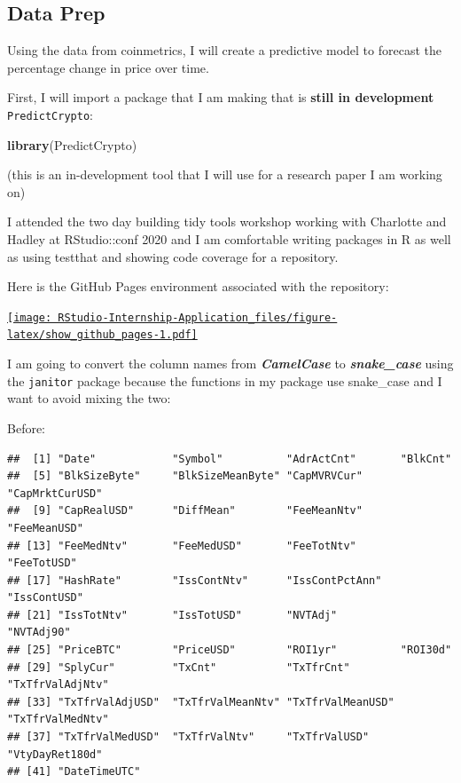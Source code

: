 \documentclass[
]{book}
\newenvironment{Shaded}{\begin{snugshade}}{\end{snugshade}}
\newcommand{\KeywordTok}[1]{\textcolor[rgb]{0.13,0.29,0.53}{\textbf{#1}}}
\newcommand{\NormalTok}[1]{#1}
\begin{document}
\hypertarget{data-prep}{%
\subsection{Data Prep}\label{data-prep}}

Using the data from coinmetrics, I will create a predictive model to forecast the percentage change in price over time.

First, I will import a package that I am making that is \textbf{still in development} \texttt{PredictCrypto}:

\begin{Shaded}
\begin{Highlighting}[]
\KeywordTok{library}\NormalTok{(PredictCrypto)}
\end{Highlighting}
\end{Shaded}

(this is an in-development tool that I will use for a research paper I am working on)

I attended the two day building tidy tools workshop working with Charlotte and Hadley at RStudio::conf 2020 and I am comfortable writing packages in R as well as using testthat and showing code coverage for a repository.

Here is the GitHub Pages environment associated with the repository:

\href{https://ries9112.github.io/PredictCrypto/}{\texttt{[image: RStudio-Internship-Application\_files/figure-latex/show\_github\_pages-1.pdf]}}

I am going to convert the column names from \textbf{\emph{CamelCase}} to \textbf{\emph{snake\_case}} using the \texttt{janitor}\citep{R-janitor} package because the functions in my package use snake\_case and I want to avoid mixing the two:

Before:

\begin{verbatim}
##  [1] "Date"            "Symbol"          "AdrActCnt"       "BlkCnt"         
##  [5] "BlkSizeByte"     "BlkSizeMeanByte" "CapMVRVCur"      "CapMrktCurUSD"  
##  [9] "CapRealUSD"      "DiffMean"        "FeeMeanNtv"      "FeeMeanUSD"     
## [13] "FeeMedNtv"       "FeeMedUSD"       "FeeTotNtv"       "FeeTotUSD"      
## [17] "HashRate"        "IssContNtv"      "IssContPctAnn"   "IssContUSD"     
## [21] "IssTotNtv"       "IssTotUSD"       "NVTAdj"          "NVTAdj90"       
## [25] "PriceBTC"        "PriceUSD"        "ROI1yr"          "ROI30d"         
## [29] "SplyCur"         "TxCnt"           "TxTfrCnt"        "TxTfrValAdjNtv" 
## [33] "TxTfrValAdjUSD"  "TxTfrValMeanNtv" "TxTfrValMeanUSD" "TxTfrValMedNtv" 
## [37] "TxTfrValMedUSD"  "TxTfrValNtv"     "TxTfrValUSD"     "VtyDayRet180d"  
## [41] "DateTimeUTC"
\end{verbatim}
\end{document}
